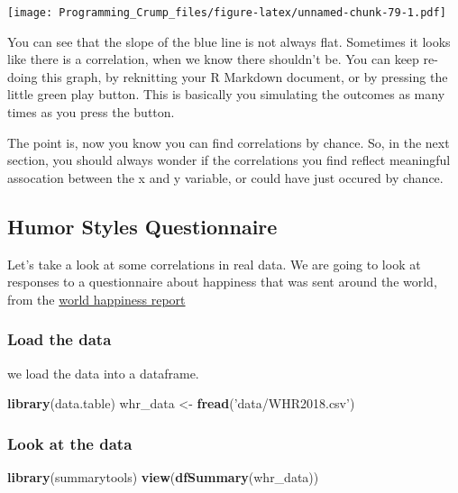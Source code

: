 \documentclass[]{book}
\newenvironment{Shaded}{\begin{snugshade}}{\end{snugshade}}
\newcommand{\KeywordTok}[1]{\textcolor[rgb]{0.13,0.29,0.53}{\textbf{{#1}}}}
\newcommand{\StringTok}[1]{\textcolor[rgb]{0.31,0.60,0.02}{{#1}}}
\newcommand{\NormalTok}[1]{{#1}}
\theoremstyle{definition}
\theoremstyle{definition}
\theoremstyle{definition}
\theoremstyle{remark}
\begin{document}
\texttt{[image: Programming\_Crump\_files/figure-latex/unnamed-chunk-79-1.pdf]}

You can see that the slope of the blue line is not always flat.
Sometimes it looks like there is a correlation, when we know there
shouldn't be. You can keep re-doing this graph, by reknitting your R
Markdown document, or by pressing the little green play button. This is
basically you simulating the outcomes as many times as you press the
button.

The point is, now you know you can find correlations by chance. So, in
the next section, you should always wonder if the correlations you find
reflect meaningful assocation between the x and y variable, or could
have just occured by chance.

\subsection{Humor Styles
Questionnaire}\label{humor-styles-questionnaire}

Let's take a look at some correlations in real data. We are going to
look at responses to a questionnaire about happiness that was sent
around the world, from the \href{http://worldhappiness.report}{world
happiness report}

\subsubsection{Load the data}\label{load-the-data}

we load the data into a dataframe.

\begin{Shaded}
\begin{Highlighting}[]
\KeywordTok{library}\NormalTok{(data.table)}
\NormalTok{whr_data <-}\StringTok{ }\KeywordTok{fread}\NormalTok{(}\StringTok{'data/WHR2018.csv'}\NormalTok{)}
\end{Highlighting}
\end{Shaded}

\subsubsection{Look at the data}\label{look-at-the-data-1}

\begin{Shaded}
\begin{Highlighting}[]
\KeywordTok{library}\NormalTok{(summarytools)}
\KeywordTok{view}\NormalTok{(}\KeywordTok{dfSummary}\NormalTok{(whr_data))}
\end{Highlighting}
\end{Shaded}
\end{document}
